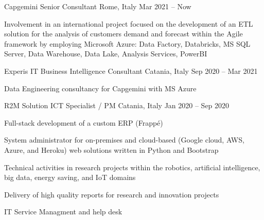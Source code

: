 
  \begin{cventries}
    \cventry
    {Capgemini}    
    {Senior Consultant}
    {Rome, Italy}
    {Mar 2021 -- Now}
    {
      \begin{cvitems}
        \item {Involvement in an international project focused on the development of an ETL solution for the analysis of customers demand and forecast within the Agile framework by employing Microsoft Azure: Data Factory, Databricks, MS SQL Server, Data Warehouse, Data Lake, Analysis Services, PowerBI}
      \end{cvitems}
    }

    \cventry
    {Experis IT}    
    {Business Intelligence Consultant}
    {Catania, Italy}
    {Sep 2020 -- Mar 2021}
    {
      \begin{cvitems}
        \item {Data Engineering consultancy for Capgemini with MS Azure}
      \end{cvitems}
    }

    \cventry
    {R2M Solution}    
    {ICT Specialist / PM}
    {Catania, Italy}
    {Jan 2020 -- Sep 2020}
    {
      \begin{cvitems}
        \item {Full-stack development of a custom ERP (Frappé)}
        \item {System administrator for on-premises and cloud-based (Google cloud, AWS, Azure, and Heroku) web solutions written in Python and Bootstrap}
        \item {Technical activities in research projects within the robotics, artificial intelligence, big data, energy saving, and IoT domains}
        \item {Delivery of high quality reports for research and innovation projects}
        \item {IT Service Managment and help desk}
      \end{cvitems}
    }



\end{cventries}
